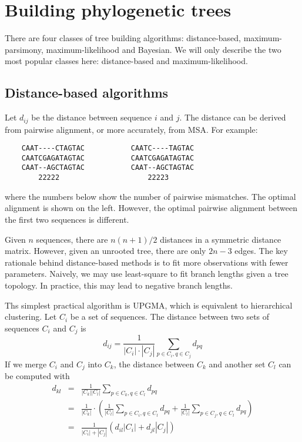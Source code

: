 \documentclass[10pt]{article}
\begin{document}
\newpage

\section{Building phylogenetic trees}

There are four classes of tree building algorithms: distance-based,
maximum-parsimony, maximum-likelihood and Bayesian. We will only describe the
two most popular classes here: distance-based and maximum-likelihood.

\subsection{Distance-based algorithms}

Let $d_{ij}$ be the distance between sequence $i$ and $j$. The distance can be
derived from pairwise alignment, or more accurately, from MSA. For example:
\begin{verbatim}
    CAAT----CTAGTAC           CAATC----TAGTAC
    CAATCGAGATAGTAC           CAATCGAGATAGTAC
    CAAT--AGCTAGTAC           CAAT--AGCTAGTAC
        22222                     22223
\end{verbatim}
where the numbers below show the number of pairwise mismatches. The optimal
alignment is shown on the left. However, the optimal pairwise alignment between
the first two sequences is different.

Given $n$ sequences, there are $n(n+1)/2$ distances in a symmetric distance
matrix. However, given an unrooted tree, there are only $2n-3$ edges. The key
rationale behind distance-based methods is to fit more observations with fewer
parameters. Naively, we may use least-square to fit branch lengths given a tree
topology. In practice, this may lead to negative branch lengths.

Ths simplest practical algorithm is UPGMA, which is equivalent to hierarchical
clustering.  Let $C_i$ be a set of sequences. The distance between two sets of
sequences $C_i$ and $C_j$ is
$$
d_{ij}=\frac{1}{|C_i|\cdot|C_j|}\sum_{p\in C_i,q\in C_j}d_{pq}
$$
If we merge $C_i$ and $C_j$ into $C_k$, the distance between $C_k$ and another
set $C_l$ can be computed with
\begin{eqnarray*}
d_{kl}&=&\frac{1}{|C_k||C_l|}\sum_{p\in C_k,q\in C_l}d_{pq}\\
&=&\frac{1}{|C_k|}\cdot\left(\frac{1}{|C_l|}\sum_{p\in C_i,q\in C_l}d_{pq}+\frac{1}{|C_l|}\sum_{p\in C_j,q\in C_l}d_{pq}\right)\\
&=&\frac{1}{|C_i|+|C_j|}\left(d_{il}|C_i|+d_{jl}|C_j|\right)
\end{eqnarray*}
\end{document}
